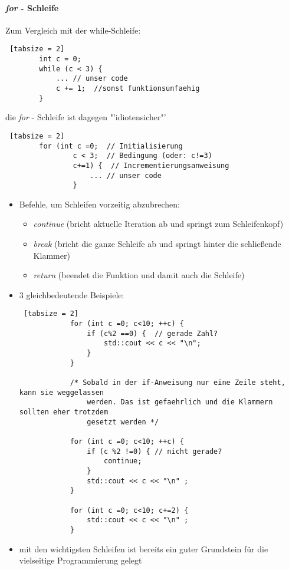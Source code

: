\documentclass{article}
\begin{document}
	\paragraph{\textit{for} - Schleife}
	Zum Vergleich mit der while-Schleife:
	\begin{lstlisting} [tabsize = 2]
		int c = 0;
		while (c < 3) {
			... // unser code
			c += 1;  //sonst funktionsunfaehig
		}
	\end{lstlisting}
	die \textit{for} - Schleife ist dagegen "'idiotensicher"'
	\begin{lstlisting} [tabsize = 2]
		for (int c =0;  // Initialisierung
				c < 3;  // Bedingung (oder: c!=3)
				c+=1) {  // Incrementierungsanweisung
					... // unser code
				}
	\end{lstlisting}
	\begin{itemize}
		\item Befehle, um Schleifen vorzeitig abzubrechen:
		\begin{itemize}
			\item \textit{continue} (bricht aktuelle Iteration ab und springt zum Schleifenkopf)
			\item \textit{break} (bricht die ganze Schleife ab und springt hinter die schließende Klammer)
			\item \textit{return} (beendet die Funktion und damit auch die Schleife)
		\end{itemize}
		\item 3 gleichbedeutende Beispiele:
		\begin{lstlisting} [tabsize = 2]
			for (int c =0; c<10; ++c) {
				if (c%2 ==0) {  // gerade Zahl?
					std::cout << c << "\n";
				}
			}
			
			/* Sobald in der if-Anweisung nur eine Zeile steht, kann sie weggelassen 
				werden. Das ist gefaehrlich und die Klammern sollten eher trotzdem
				gesetzt werden */
			
			for (int c =0; c<10; ++c) {
				if (c %2 !=0) { // nicht gerade?
					continue;
				}
				std::cout << c << "\n" ;
			}
			
			for (int c =0; c<10; c+=2) {
				std::cout << c << "\n" ;
			}
		\end{lstlisting}
		\item mit den wichtigsten Schleifen ist bereits ein guter Grundstein für die vielseitige Programmierung gelegt
	\end{itemize}
	
\end{document}
